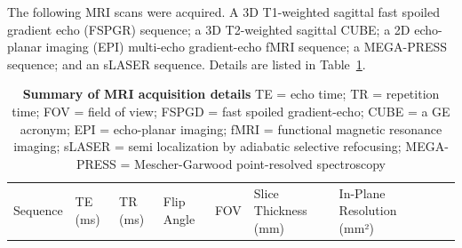 \documentclass[
true
]{sn-jnl}
\begin{document}
The following MRI scans were acquired. A 3D T1-weighted sagittal fast
spoiled gradient echo (FSPGR) sequence; a 3D T2-weighted sagittal CUBE;
a 2D echo-planar imaging (EPI) multi-echo gradient-echo fMRI sequence; a
MEGA-PRESS sequence; and an sLASER sequence. Details are listed in
Table~\ref{tbl-mriacq}.

\begin{longtable}[]{@{}
  >{\raggedright\arraybackslash}p{}
  >{\raggedright\arraybackslash}p{}
  >{\raggedright\arraybackslash}p{}
  >{\raggedright\arraybackslash}p{}
  >{\raggedright\arraybackslash}p{}
  >{\raggedright\arraybackslash}p{}
  >{\raggedright\arraybackslash}p{}
  >{\raggedright\arraybackslash}p{}
  >{\raggedright\arraybackslash}p{}@{}}
\caption{\textbf{Summary of MRI acquisition details} TE = echo time; TR
= repetition time; FOV = field of view; FSPGD = fast spoiled
gradient-echo; CUBE = a GE acronym; EPI = echo-planar imaging; fMRI =
functional magnetic resonance imaging; sLASER = semi localization by
adiabatic selective refocusing; MEGA-PRESS = Mescher-Garwood
point-resolved spectroscopy}\label{tbl-mriacq}\tabularnewline
\toprule\noalign{}
\begin{minipage}[b]{\linewidth}\raggedright
Sequence
\end{minipage} & \begin{minipage}[b]{\linewidth}\raggedright
TE (ms)
\end{minipage} & \begin{minipage}[b]{\linewidth}\raggedright
TR (ms)
\end{minipage} & \begin{minipage}[b]{\linewidth}\raggedright
Flip Angle
\end{minipage} & \begin{minipage}[b]{\linewidth}\raggedright
FOV
\end{minipage} & \begin{minipage}[b]{\linewidth}\raggedright
Slice Thickness (mm)
\end{minipage} & \begin{minipage}[b]{\linewidth}\raggedright
In-Plane Resolution (mm²)
\end{minipage} & \begin{minipage}[b]{\linewidth}\raggedright

\end{minipage}
\end{longtable}
\end{document}
